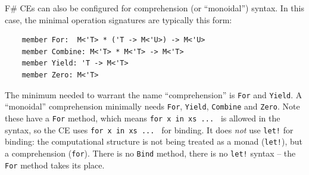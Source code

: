 \documentclass[acmsmall]{acmart}\settopmatter{}
\begin{document}
F\# CEs can also be configured for comprehension (or ``monoidal'') syntax. In this case, the minimal operation signatures are typically this form:
\begin{verbatim}
    member For:  M<'T> * ('T -> M<'U>) -> M<'U>
    member Combine: M<'T> * M<'T> -> M<'T>
    member Yield: 'T -> M<'T>
    member Zero: M<'T>
\end{verbatim}
The minimum needed to warrant the name ``comprehension'' is \texttt{For} and \texttt{Yield}.  A ``monoidal'' comprehension minimally
needs \texttt{For}, \texttt{Yield}, \texttt{Combine} and \texttt{Zero}. 
Note these have a \texttt{For} method, which means \texttt{for x in xs  ... } is allowed in the syntax, so the CE uses \texttt{for x in xs ... } for binding.
It does \emph{not} use \texttt{let!} for binding: the computational structure is not being treated as a monad (\texttt{let!}), but a comprehension (\texttt{for}).
There is no \texttt{Bind} method, there is no \texttt{let!} syntax -- the \texttt{For} method takes its place.  
\end{document}
